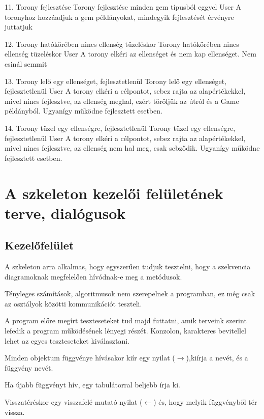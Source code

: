 \usecase
{11. Torony fejlesztése}
{Torony fejlesztése minden gem típusból eggyel}
{User}
{A toronyhoz hozzáadjuk a gem példányokat, mindegyik fejlesztését érvényre juttatjuk}

\usecase
{12. Torony hatókörében nincs ellenség tüzeléskor}
{Torony hatókörében nincs ellenség tüzeléskor}
{User}
{A torony elkéri az ellenséget és nem kap ellenséget. Nem csinál semmit}

\usecase
{13. Torony lelő egy ellenséget, fejlesztetlenül}
{Torony lelő egy ellenséget, fejlesztetlenül}
{User}
{A torony elkéri a célpontot, sebez rajta az alapértékekkel, mivel nincs fejlesztve, az ellenség meghal, ezért töröljük az útról és a Game példányból. Ugyanígy működne fejlesztett esetben.}

\usecase
{14. Torony tüzel egy ellenségre, fejlesztetlenül}
{Torony tüzel egy ellenségre, fejlesztetlenül}
{User}
{A torony elkéri a célpontot, sebez rajta az alapértékekkel, mivel nincs fejlesztve, az ellenség nem hal meg, csak sebződik. Ugyanígy működne fejlesztett esetben.}




\section{A szkeleton kezelői felületének terve, dialógusok}
\subsection{Kezelőfelület}
A szkeleton arra alkalmas, hogy egyszerűen tudjuk tesztelni, hogy a szekvencia diagramoknak megfelelően hívódnak-e meg a metódusok.

Tényleges számítások, algoritmusok nem szerepelnek a programban, ez még csak az osztályok közötti kommunikációt teszteli.

A program előre megírt teszteseteket tud majd futtatni, amik terveink szerint lefedik a program működésének lényegi részét.
Konzolon, karakteres bevitellel lehet az egyes teszteseteket kiválasztani. 

Minden objektum függvénye hívásakor kiír egy nyilat ($\rightarrow$),kiírja a nevét, és a függvény nevét.

Ha újabb függvényt hív, egy tabulátorral beljebb írja ki.

Visszatéréskor egy visszafelé mutató nyilat ($\leftarrow$) és, hogy melyik függvényből tér vissza.

